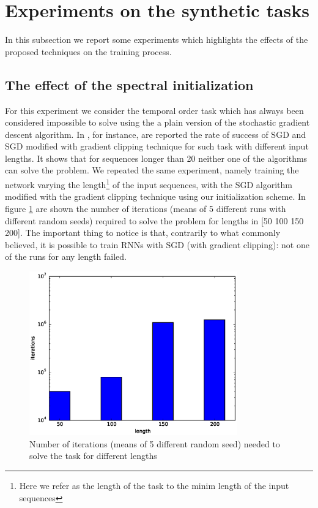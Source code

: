 \section{Experiments on the synthetic tasks}
In this subsection we report some experiments which highlights the effects of the proposed techniques on the training process.

\subsection{The effect of the spectral initialization}

For this experiment we consider the temporal order task which has always been considered impossible to solve using the a plain version of the stochastic  gradient descent algorithm.
In \cite{advancesInOptimizingRnns}, for instance, are reported the rate of success of SGD and SGD modified with gradient clipping technique for such task with different input lengths. It shows that for sequences longer than 20 neither one of the algorithms can solve the problem. We repeated the same experiment, namely training the network varying the length\footnote{Here we refer as the length of the task to the minim length of the input sequences} of the input sequences, with the SGD algorithm modified with the gradient clipping technique using our initialization scheme. In figure \ref{fig:spectral_init_effect} are shown the number of iterations (means of 5 different runs with different random seeds) required to solve the problem for lengths in [50 100 150 200]. The important thing to notice is that, contrarily to what commonly believed, it is possible to train RNNs with SGD (with gradient clipping): not one of the runs for any length failed.

\begin{figure}
	\centering
	\includegraphics[width= 0.8\textwidth]{chapter4/spectral_init_exp.eps}
	\caption{Number of iterations (means of 5 different random seed) needed to solve the task for different lengths}
	\label{fig:spectral_init_effect}
\end{figure}
